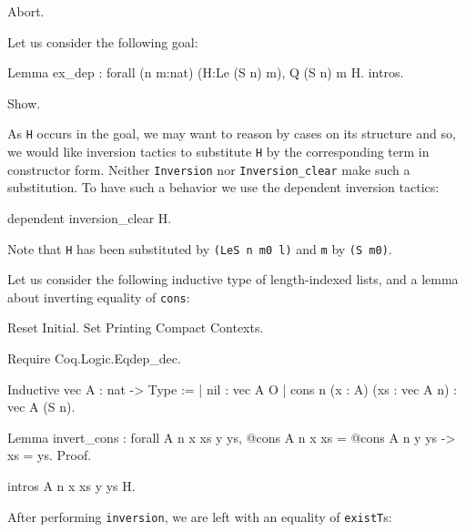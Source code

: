 \begin{coq_example*}
\begin{coq_eval}
Abort.
\end{coq_eval}


Let us consider the following goal:

\begin{coq_eval}
Lemma ex_dep : forall (n m:nat) (H:Le (S n) m), Q (S n) m H.
intros.
\end{coq_eval}

\begin{coq_example}
Show.
\end{coq_example}

As \texttt{H} occurs in the goal, we may want to reason by cases on its
structure and so, we would like  inversion tactics to
substitute \texttt{H} by the corresponding term in constructor form.
Neither \texttt{Inversion} nor  {\tt Inversion\_clear} make such a
substitution.
To have such a behavior we use the dependent inversion tactics:

\begin{coq_example}
dependent inversion_clear H.
\end{coq_example}

Note that \texttt{H} has been substituted by \texttt{(LeS n m0 l)} and
\texttt{m} by \texttt{(S m0)}.


Let us consider the following inductive type of length-indexed lists,
and a lemma about inverting equality of \texttt{cons}:

\begin{coq_eval}
Reset Initial.
Set Printing Compact Contexts.
\end{coq_eval}

\begin{coq_example*}
Require Coq.Logic.Eqdep_dec.

Inductive vec A : nat -> Type :=
| nil : vec A O
| cons {n} (x : A) (xs : vec A n) : vec A (S n).

Lemma invert_cons : forall A n x xs y ys,
    @cons A n x xs = @cons A n y ys
    -> xs = ys.
Proof.
\end{coq_example*}

\begin{coq_example}
intros A n x xs y ys H.
\end{coq_example}

After performing \texttt{inversion}, we are left with an equality of
\texttt{existT}s:


\end{coq_example*}
